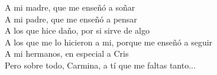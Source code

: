 

\renewcommand{\contentsname}{Índice General}
\renewcommand{\listtablename}{Lista de Tablas}
\renewcommand{\tablename}{Tabla}


\newpage
\thispagestyle{empty}
\begin{flushright}
	\phantom{blank}
	\vspace{25mm}

	A mi madre, que me enseñó a soñar \\
	A mi padre, que me enseñó a pensar  \\
	A los que hice daño, por si sirve de algo  \\
	A los que me lo hicieron a mi, porque me enseñó a seguir  \\
	A mi hermanos, en especial a Cris  \\
	Pero sobre todo, Carmina, a tí que me faltas tanto...  \\
\end{flushright}


\tableofcontents
\newpage
\cleardoublepage
\listoffigures %
\cleardoublepage
\listoftables %

\newpage	